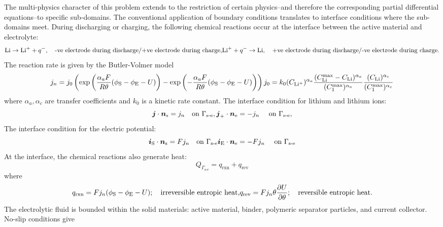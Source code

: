 The multi-\/physics character of this problem extends to the restriction of certain physics--and therefore the corresponding partial differential equations--to specific sub-\/domains. The conventional application of boundary conditions translates to interface conditions where the sub-\/domains meet. During discharging or charging, the following chemical reactions occur at the interface between the active material and electrolyte\+: \[ \text{Li}\to \text{Li}^++q^-, \quad \text{-ve electrode during discharge/+ve electrode during charge,}\nonumber\\ \text{Li}^++q^- \to\text{Li},\quad \text{+ve electrode during discharge/-ve electrode during charge}.\nonumber \] The reaction rate is given by the Butler-\/\+Volmer model \[ j_n=j_0\left(\text{exp}\left(\frac{\alpha_aF}{R\theta}(\phi_\text{S}-\phi_\text{E}-U)\right)-\text{exp}\left(-\frac{\alpha_aF}{R\theta}(\phi_\text{S}-\phi_\text{E}-U)\right)\right) \label{eq:BVeuqation}\\ j_0=k_0(C_{\text{Li}^+})^{\alpha_a} \frac{(C_\text{Li}^{\text{max}}-C_\text{Li})^{\alpha_a}}{(C_1^{\text{max}})^{\alpha_a}} \frac{(C_\text{Li})^{\alpha_c}}{{(C_1^\text{max}})^{\alpha_c}} \] where $\alpha_a, \alpha_c$ are transfer coefficients and $k_0$ is a kinetic rate constant. The interface condition for lithium and lithium ions\+: \[ \boldsymbol{j}\cdot \boldsymbol{n}_\text{s}=j_n \quad \text{on } \Gamma_\text{s-e},\\ \boldsymbol{j}_+\cdot \boldsymbol{n}_\text{e}=-j_n\ \quad \text{on } \Gamma_\text{s-e}, \] The interface condition for the electric potential\+: \[ \boldsymbol{i}_\text{S}\cdot\boldsymbol{n}_\text{s}=Fj_n \quad \text{on } \Gamma_\text{s-e}\\ \boldsymbol{i}_\text{E}\cdot\boldsymbol{n}_\text{e}=-Fj_n \ \quad \text{on } \Gamma_\text{s-e} \] At the interface, the chemical reactions also generate heat\+: \[ Q_{\Gamma_\text{s-e}}=q_{\text{rxn}}+q_{\text{rev}} \] where \[ q_{\text{rxn}}=Fj_n(\phi_\text{S}-\phi_\text{E}-U) ;\quad \text{irreversible entropic heat,} \\ q_{\text{rev}}=Fj_n\theta\frac{\partial U}{\partial \theta};\quad\text{reversible entropic heat.} \] The electrolytic fluid is bounded within the solid materials\+: active material, binder, polymeric separator particles, and current collector. No-\/slip conditions give ~\newline
